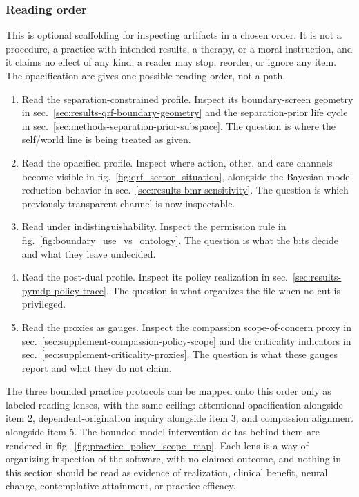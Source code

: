 \documentclass[
]{article}
\providecommand{\tightlist}{%
  \setlength{\itemsep}{0pt}\setlength{\parskip}{0pt}}
\begin{document}
\subsubsection{Reading order}\label{reading-order}

This is optional scaffolding for inspecting artifacts in a chosen order.
It is not a procedure, a practice with intended results, a therapy, or a
moral instruction, and it claims no effect of any kind; a reader may
stop, reorder, or ignore any item. The opacification arc gives one
possible reading order, not a path.

\begin{enumerate}
\def\labelenumi{\arabic{enumi}.}
\tightlist
\item
  Read the separation-constrained profile. Inspect its boundary-screen
  geometry in sec.~\ref{sec:results-qrf-boundary-geometry} and the
  separation-prior life cycle in
  sec.~\ref{sec:methods-separation-prior-subspace}. The question is
  where the self/world line is being treated as given.
\item
  Read the opacified profile. Inspect where action, other, and care
  channels become visible in fig.~\ref{fig:qrf_sector_situation},
  alongside the Bayesian model reduction behavior in
  sec.~\ref{sec:results-bmr-sensitivity}. The question is which
  previously transparent channel is now inspectable.
\item
  Read under indistinguishability. Inspect the permission rule in
  fig.~\ref{fig:boundary_use_vs_ontology}. The question is what the bits
  decide and what they leave undecided.
\item
  Read the post-dual profile. Inspect its policy realization in
  sec.~\ref{sec:results-pymdp-policy-trace}. The question is what
  organizes the file when no cut is privileged.
\item
  Read the proxies as gauges. Inspect the compassion scope-of-concern
  proxy in sec.~\ref{sec:supplement-compassion-policy-scope} and the
  criticality indicators in
  sec.~\ref{sec:supplement-criticality-proxies}. The question is what
  these gauges report and what they do not claim.
\end{enumerate}

The three bounded practice protocols can be mapped onto this order only
as labeled reading lenses, with the same ceiling: attentional
opacification alongside item 2, dependent-origination inquiry alongside
item 3, and compassion alignment alongside item 5. The bounded
model-intervention deltas behind them are rendered in
fig.~\ref{fig:practice_policy_scope_map}. Each lens is a way of
organizing inspection of the software, with no claimed outcome, and
nothing in this section should be read as evidence of realization,
clinical benefit, neural change, contemplative attainment, or practice
efficacy.
\end{document}

